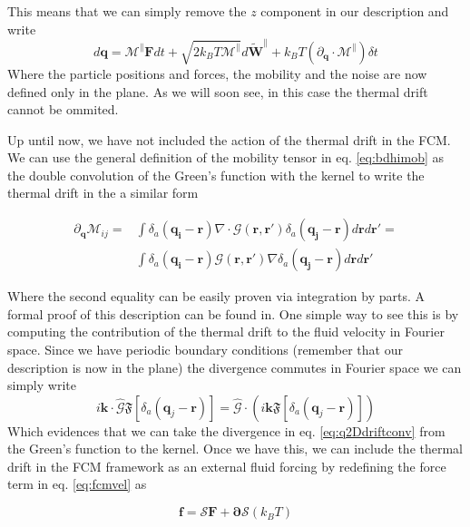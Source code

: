 \documentclass[ twoside,openright,titlepage,numbers=noenddot,%
headinclude,footinclude,cleardoublepage=empty,abstract=on,
BCOR=5mm,paper=a4,fontsize=11pt, dvipsnames
]{scrreprt}
\renewcommand{\vec}[1]{\bm{#1}}
\newcommand{\tens}[1]{\bm{\mathcal{#1}}}
\newcommand{\oper}[1]{\mathcal{#1}}
\newcommand{\dt}{\delta t}
\newcommand{\kT}{k_B T}
\newcommand{\fou}[1]{\widehat{#1}}
\newcommand{\ppos}{q}
\begin{document}
This means that we can simply remove the $z$ component in our description and write
\begin{equation}
  d\vec{\ppos} = \tens{M}^{\parallel}\vec{F}dt + \sqrt{2\kT \tens{M}^{\parallel}}d\vec{\widetilde{W}^{\parallel}} + \kT\left(\partial_{\vec{\ppos}}\cdot\tens{M}^{\parallel}\right)\dt
\end{equation}
Where the particle positions and forces, the mobility and the noise are now defined only in the plane.
As we will soon see, in this case the thermal drift cannot be ommited.

Up until now, we have not included the action of the thermal drift in the \gls{FCM}. We can use the general definition of the mobility tensor in eq. \eqref{eq:bdhimob} as the double convolution of the Green's function with the kernel to write the thermal drift in the a similar form

\begin{equation}
  \label{eq:q2Ddriftconv}
  \begin{aligned}
    \partial_{\vec{\ppos}}\tens{M}_{ij}=& \int\delta_a(\vec{\ppos_i} -\vec{r})\nabla\cdot\tens{G}(\vec{r},\vec{r}')\delta_a(\vec{\ppos_j} -\vec{r})d\vec{r}d\vec{r}' =\\
     &\int\delta_a(\vec{\ppos_i} -\vec{r})\tens{G}(\vec{r},\vec{r}')\nabla\delta_a(\vec{\ppos_j} -\vec{r})d\vec{r}d\vec{r}'    
\end{aligned}
\end{equation}

Where the second equality can be easily proven via integration by parts. A formal proof of this description can be found in\cite{Donev2014}. One simple way to see this is by computing the contribution of the thermal drift to the fluid velocity in Fourier space. Since we have periodic boundary conditions (remember that our description is now in the plane) the divergence commutes in Fourier space we can simply write
\begin{equation}
  i\vec{k}\cdot\fou{\tens{G}}\mathfrak{F}\left[\delta_a(\vec{\ppos}_j -\vec{r})\right] = \fou{\tens{G}}\cdot \left(i\vec{k}\mathfrak{F}\left[\delta_a(\vec{\ppos}_j -\vec{r})\right]\right)
\end{equation}
Which evidences that we can take the divergence in eq. \eqref{eq:q2Ddriftconv} from the Green's function to the kernel.
Once we have this, we can include the thermal drift in the \gls{FCM} framework as an external fluid forcing by redefining the force term in eq. \eqref{eq:fcmvel} as

\begin{equation}
  \label{eq:q2Ddrifasforce}
  \vec{f} = \oper{S}\vec{F} + \vec{\partial}\oper{S}(\kT)
\end{equation}
\end{document}
